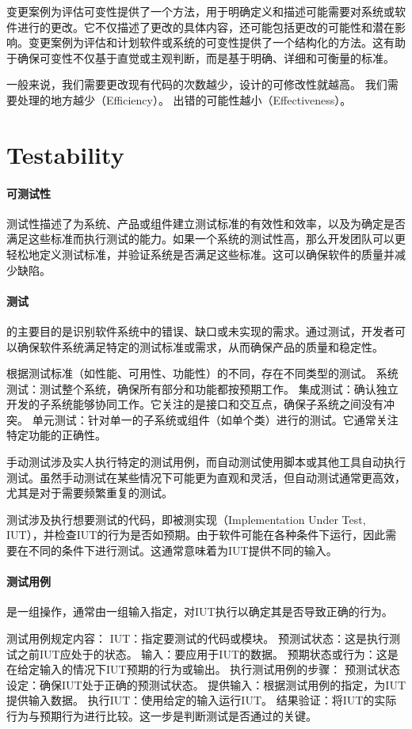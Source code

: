 \documentclass[]{ctexbook}
\begin{document}
变更案例为评估可变性提供了一个方法，用于明确定义和描述可能需要对系统或软件进行的更改。它不仅描述了更改的具体内容，还可能包括更改的可能性和潜在影响。变更案例为评估和计划软件或系统的可变性提供了一个结构化的方法。这有助于确保可变性不仅基于直觉或主观判断，而是基于明确、详细和可衡量的标准。

一般来说，我们需要更改现有代码的次数越少，设计的可修改性就越高。
我们需要处理的地方越少（Efficiency）。
出错的可能性越小（Effectiveness）。

\section{Testability}
\paragraph{可测试性}测试性描述了为系统、产品或组件建立测试标准的有效性和效率，以及为确定是否满足这些标准而执行测试的能力。如果一个系统的测试性高，那么开发团队可以更轻松地定义测试标准，并验证系统是否满足这些标准。这可以确保软件的质量并减少缺陷。
\paragraph{测试}的主要目的是识别软件系统中的错误、缺口或未实现的需求。通过测试，开发者可以确保软件系统满足特定的测试标准或需求，从而确保产品的质量和稳定性。

根据测试标准（如性能、可用性、功能性）的不同，存在不同类型的测试。
系统测试：测试整个系统，确保所有部分和功能都按预期工作。
集成测试：确认独立开发的子系统能够协同工作。它关注的是接口和交互点，确保子系统之间没有冲突。
单元测试：针对单一的子系统或组件（如单个类）进行的测试。它通常关注特定功能的正确性。

手动测试涉及实人执行特定的测试用例，而自动测试使用脚本或其他工具自动执行测试。虽然手动测试在某些情况下可能更为直观和灵活，但自动测试通常更高效，尤其是对于需要频繁重复的测试。

测试涉及执行想要测试的代码，即被测实现（Implementation Under Test, IUT），并检查IUT的行为是否如预期。由于软件可能在各种条件下运行，因此需要在不同的条件下进行测试。这通常意味着为IUT提供不同的输入。

\paragraph{测试用例}是一组操作，通常由一组输入指定，对IUT执行以确定其是否导致正确的行为。

测试用例规定内容：
IUT：指定要测试的代码或模块。
预测试状态：这是执行测试之前IUT应处于的状态。
输入：要应用于IUT的数据。
预期状态或行为：这是在给定输入的情况下IUT预期的行为或输出。
执行测试用例的步骤：
预测试状态设定：确保IUT处于正确的预测试状态。
提供输入：根据测试用例的指定，为IUT提供输入数据。
执行IUT：使用给定的输入运行IUT。
结果验证：将IUT的实际行为与预期行为进行比较。这一步是判断测试是否通过的关键。
\end{document}
